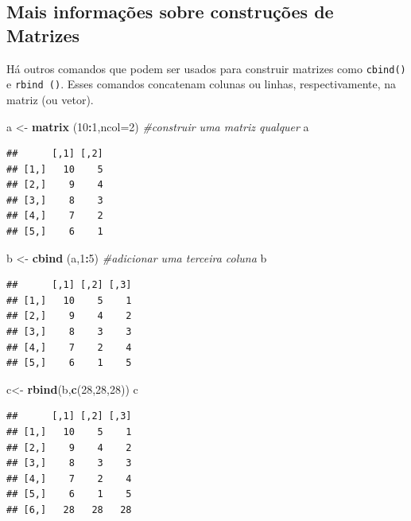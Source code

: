 \documentclass[]{book}
\newenvironment{Shaded}{\begin{snugshade}}{\end{snugshade}}
\newcommand{\CommentTok}[1]{\textcolor[rgb]{0.56,0.35,0.01}{\textit{#1}}}
\newcommand{\DataTypeTok}[1]{\textcolor[rgb]{0.13,0.29,0.53}{#1}}
\newcommand{\DecValTok}[1]{\textcolor[rgb]{0.00,0.00,0.81}{#1}}
\newcommand{\KeywordTok}[1]{\textcolor[rgb]{0.13,0.29,0.53}{\textbf{#1}}}
\newcommand{\NormalTok}[1]{#1}
\newcommand{\OperatorTok}[1]{\textcolor[rgb]{0.81,0.36,0.00}{\textbf{#1}}}
\newcommand{\StringTok}[1]{\textcolor[rgb]{0.31,0.60,0.02}{#1}}
\begin{document}
\hypertarget{mais-informacoes-sobre-construcoes-de-matrizes}{%
\subsection{Mais informações sobre construções de Matrizes}\label{mais-informacoes-sobre-construcoes-de-matrizes}}

Há outros comandos que podem ser usados para construir matrizes como \texttt{cbind()} e \texttt{rbind\ ()}. Esses comandos concatenam colunas ou linhas, respectivamente, na matriz (ou vetor).

\begin{Shaded}
\begin{Highlighting}[]
\NormalTok{a <-}\StringTok{ }\KeywordTok{matrix}\NormalTok{ (}\DecValTok{10}\OperatorTok{:}\DecValTok{1}\NormalTok{,}\DataTypeTok{ncol=}\DecValTok{2}\NormalTok{) }\CommentTok{#construir uma matriz qualquer}
\NormalTok{a}
\end{Highlighting}
\end{Shaded}

\begin{verbatim}
##      [,1] [,2]
## [1,]   10    5
## [2,]    9    4
## [3,]    8    3
## [4,]    7    2
## [5,]    6    1
\end{verbatim}

\begin{Shaded}
\begin{Highlighting}[]
\NormalTok{b <-}\StringTok{ }\KeywordTok{cbind}\NormalTok{ (a,}\DecValTok{1}\OperatorTok{:}\DecValTok{5}\NormalTok{) }\CommentTok{#adicionar uma terceira coluna}
\NormalTok{b}
\end{Highlighting}
\end{Shaded}

\begin{verbatim}
##      [,1] [,2] [,3]
## [1,]   10    5    1
## [2,]    9    4    2
## [3,]    8    3    3
## [4,]    7    2    4
## [5,]    6    1    5
\end{verbatim}

\begin{Shaded}
\begin{Highlighting}[]
\NormalTok{c<-}\StringTok{ }\KeywordTok{rbind}\NormalTok{(b,}\KeywordTok{c}\NormalTok{(}\DecValTok{28}\NormalTok{,}\DecValTok{28}\NormalTok{,}\DecValTok{28}\NormalTok{))}
\NormalTok{c}
\end{Highlighting}
\end{Shaded}

\begin{verbatim}
##      [,1] [,2] [,3]
## [1,]   10    5    1
## [2,]    9    4    2
## [3,]    8    3    3
## [4,]    7    2    4
## [5,]    6    1    5
## [6,]   28   28   28
\end{verbatim}
\end{document}
